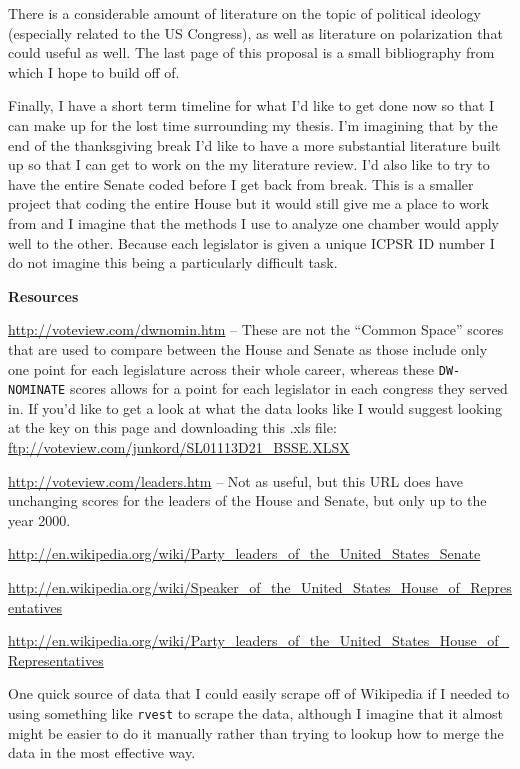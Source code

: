 \documentclass[10pt]{article}
\begin{document}
There is a considerable amount of literature on the topic of political ideology (especially related to the US Congress), as well as literature on polarization that could useful as well. The last page of this proposal is a small bibliography from which I hope to build off of.

Finally, I have a short term timeline for what I'd like to get done now so that I can make up for the lost time surrounding my thesis. I'm imagining that by the end of the thanksgiving break I'd like to have a more substantial literature built up so that I can get to work on the my literature review. I'd also like to try to have the entire Senate coded before I get back from break. This is a smaller project that coding the entire House but it would still give me a place to work from and I imagine that the methods I use to analyze one chamber would apply well to the other. Because each legislator is given a unique ICPSR ID number I do not imagine this being a particularly difficult task.

\newpage


\begin{center}
	\textbf{Resources}
\end{center}

\setlength{\parindent}{0pt}
\hangindent=1cm

\url{http://voteview.com/dwnomin.htm} -- These are not the ``Common Space'' scores that are used to compare between the House and Senate as those include only one point for each legislature across their whole career, whereas these \texttt{DW-NOMINATE} scores allows for a point for each legislator in each congress they served in. If you'd like to get a look at what the data looks like I would suggest looking at the key on this page and downloading this .xls file: \url{ftp://voteview.com/junkord/SL01113D21_BSSE.XLSX}

\url{http://voteview.com/leaders.htm} -- 
	Not as useful, but this URL does have unchanging scores for the leaders of the House and Senate, but only up to the year 2000.

\url{http://en.wikipedia.org/wiki/Party_leaders_of_the_United_States_Senate}

\url{http://en.wikipedia.org/wiki/Speaker_of_the_United_States_House_of_Representatives}

\url{http://en.wikipedia.org/wiki/Party_leaders_of_the_United_States_House_of_Representatives}

\hspace{1cm} One quick source of data that I could easily scrape off of Wikipedia if I needed to using something like \texttt{rvest} to scrape the data, although I imagine that it almost might be easier to do it manually rather than trying to lookup how to merge the data in the most effective way.
\end{document}
